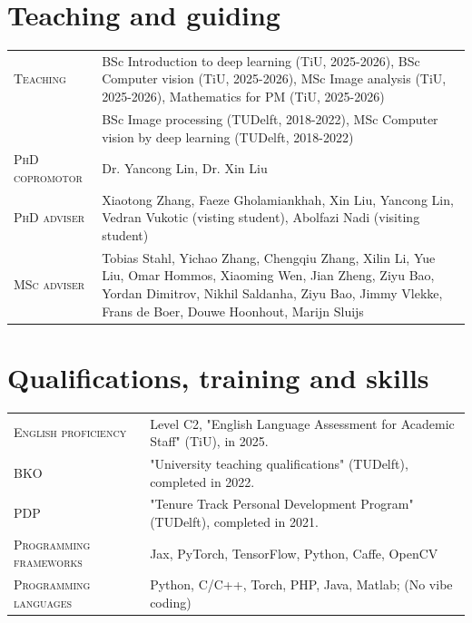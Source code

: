 \documentclass[a4paper, oneside, final]{scrartcl}
\begin{document}
\begin{center}
		\section{Teaching and guiding}
        \begin{tabular}{p{3.5cm}@{\hskip 0.3in}p{12.3cm}}
            \textsc{Teaching}		            & BSc Introduction to deep learning (TiU, 2025-2026), BSc Computer vision (TiU, 2025-2026), MSc Image analysis (TiU, 2025-2026), Mathematics for PM (TiU, 2025-2026)\\
                                                & BSc Image processing (TUDelft, 2018-2022), MSc Computer vision by deep learning (TUDelft, 2018-2022)\\
			\textsc{PhD copromotor}             & Dr. Yancong Lin, Dr. Xin Liu\\ 
			\textsc{PhD adviser}                & Xiaotong Zhang, Faeze Gholamiankhah, Xin Liu, Yancong Lin, Vedran Vukotic (visting student), Abolfazi Nadi (visiting student)\\ 
			\textsc{MSc adviser}                & Tobias Stahl, Yichao Zhang, Chengqiu Zhang, Xilin Li, Yue Liu, Omar Hommos, Xiaoming Wen, Jian Zheng, Ziyu Bao, Yordan Dimitrov, Nikhil Saldanha, Ziyu Bao, Jimmy Vlekke, Frans de Boer, Douwe Hoonhout, Marijn Sluijs\\
		\end{tabular}

		\section{Qualifications, training and skills}
        \begin{tabular}{p{4.5cm}@{\hskip 0.3in}p{11.3cm}}
            \textsc{English proficiency}  & Level C2, "English Language Assessment for Academic Staff" (TiU), in 2025.\\
            \textsc{BKO}                  & "University teaching qualifications" (TUDelft), completed in 2022.\\
            \textsc{PDP}                  & "Tenure Track Personal Development Program" (TUDelft), completed in 2021.\\
			\textsc{Programming frameworks}     & Jax, PyTorch, TensorFlow, Python, Caffe, OpenCV \\
			\textsc{Programming languages}      & Python, C\slash C++, Torch, PHP, Java, Matlab; (No vibe coding)\\
		\end{tabular}


\end{center}
\end{document}
